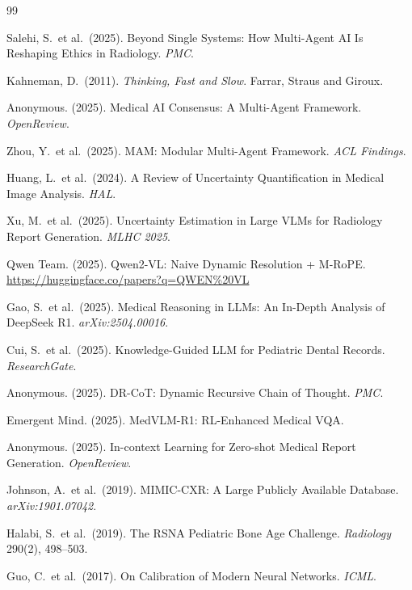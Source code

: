 \documentclass[10pt,twocolumn]{article}
\begin{document}

\begin{thebibliography}{99}

Salehi, S.\ et al.\ (2025).
Beyond Single Systems: How Multi-Agent AI Is Reshaping Ethics in Radiology.
\emph{PMC}.

Kahneman, D.\ (2011).
\emph{Thinking, Fast and Slow}. Farrar, Straus and Giroux.

Anonymous. (2025).
Medical AI Consensus: A Multi-Agent Framework.
\emph{OpenReview}.

Zhou, Y.\ et al.\ (2025).
MAM: Modular Multi-Agent Framework.
\emph{ACL Findings}.

Huang, L.\ et al.\ (2024).
A Review of Uncertainty Quantification in Medical Image Analysis.
\emph{HAL}.

Xu, M.\ et al.\ (2025).
Uncertainty Estimation in Large VLMs for Radiology Report Generation.
\emph{MLHC 2025}.

Qwen Team. (2025).
Qwen2-VL: Naive Dynamic Resolution + M-RoPE.
\url{https://huggingface.co/papers?q=QWEN\%20VL}

Gao, S.\ et al.\ (2025).
Medical Reasoning in LLMs: An In-Depth Analysis of DeepSeek R1.
\emph{arXiv:2504.00016}.

Cui, S.\ et al.\ (2025).
Knowledge-Guided LLM for Pediatric Dental Records.
\emph{ResearchGate}.

Anonymous. (2025).
DR-CoT: Dynamic Recursive Chain of Thought.
\emph{PMC}.

Emergent Mind. (2025).
MedVLM-R1: RL-Enhanced Medical VQA.

Anonymous. (2025).
In-context Learning for Zero-shot Medical Report Generation.
\emph{OpenReview}.

Johnson, A.\ et al.\ (2019).
MIMIC-CXR: A Large Publicly Available Database.
\emph{arXiv:1901.07042}.

Halabi, S.\ et al.\ (2019).
The RSNA Pediatric Bone Age Challenge.
\emph{Radiology} 290(2), 498--503.

Guo, C.\ et al.\ (2017).
On Calibration of Modern Neural Networks.
\emph{ICML}.


\end{thebibliography}
\end{document}
